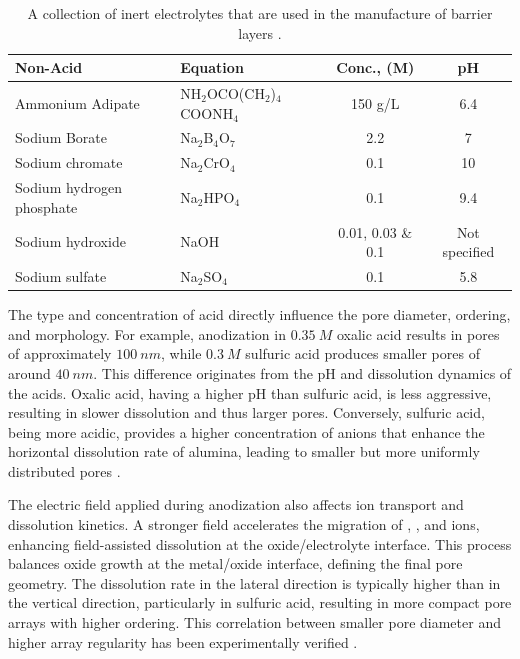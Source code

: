 \documentclass{rapportCS}
\begin{document}
	
	\begin{table}[h]
		\caption{A collection of inert electrolytes that are used in the manufacture of barrier layers \cite{talbot2018corrosion}.}
		\begin{tabular}{|l|l|c|c|}
			\hline
			\textbf{Non-Acid} & \textbf{Equation} & \textbf{Conc., (M)} & \textbf{pH} \\ \hline
			Ammonium Adipate & NH$_2$OCO(CH$_2$)$_4$COONH$_4$ & 150 g/L & 6.4 \\ \hline
			Sodium Borate & Na$_2$B$_4$O$_7$ & 2.2 & 7 \\ \hline
			Sodium chromate & Na$_2$CrO$_4$ & 0.1 & 10 \\ \hline
			Sodium hydrogen phosphate & Na$_2$HPO$_4$ & 0.1 & 9.4 \\ \hline
			Sodium hydroxide & NaOH & 0.01, 0.03 \& 0.1 & Not specified \\ \hline
			Sodium sulfate & Na$_2$SO$_4$ & 0.1 & 5.8 \\ \hline
		\end{tabular}
		\label{tab:basic}
	\end{table}
	
	
	The type and concentration of acid directly influence the pore diameter, ordering, and morphology. For example, anodization in $0.35~M$ oxalic acid results in pores of approximately $100~nm$, while $0.3~M$ sulfuric acid produces smaller pores of around $40~nm$. This difference originates from the pH and dissolution dynamics of the acids. Oxalic acid, having a higher pH than sulfuric acid, is less aggressive, resulting in slower dissolution and thus larger pores. Conversely, sulfuric acid, being more acidic, provides a higher concentration of anions that enhance the horizontal dissolution rate of alumina, leading to smaller but more uniformly distributed pores \cite{eessaa2023review}.
	
	The electric field applied during anodization also affects ion transport and dissolution kinetics. A stronger field accelerates the migration of , , and  ions, enhancing field-assisted dissolution at the oxide/electrolyte interface. This process balances oxide growth at the metal/oxide interface, defining the final pore geometry. The dissolution rate in the lateral direction is typically higher than in the vertical direction, particularly in sulfuric acid, resulting in more compact pore arrays with higher ordering. This correlation between smaller pore diameter and higher array regularity has been experimentally verified \cite{eessaa2023review}. 
	
\end{document}
